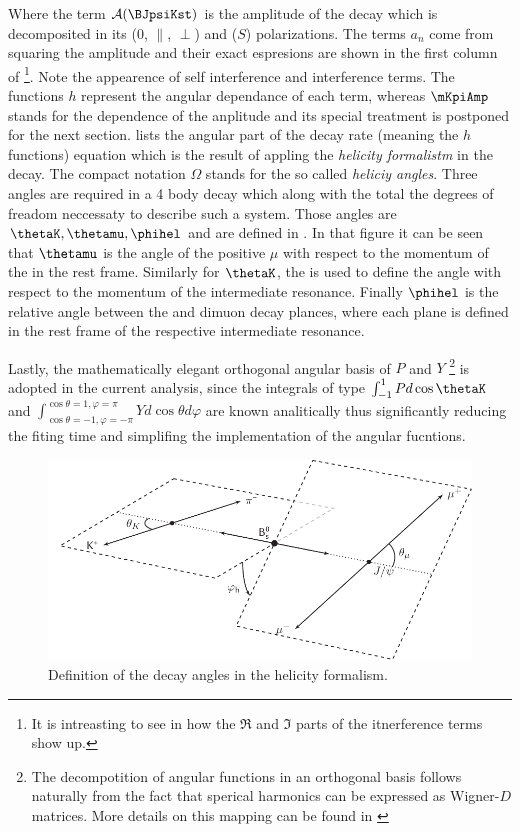 \noindent Where the term $\mathcal{A}(\text{\BJpsiKst})$ is the amplitude of the decay which is decomposited in its \pwave ($0$, $\parallel$, $\perp$) and \swave ($S$) polarizations.
The terms $a_n$ come from squaring the amplitude and their exact espresions are shown in the first column of 
\footnote{It is intreasting to see in \cite{jeroenThesis} how the $\Re$ and $\Im$ parts of the itnerference terms show up.}. 
Note the appearence of \pwave self interference and \spwave interference terms. The functions $h$ represent the angular dependance of each term, whereas $\mKpiAmp$ stands 
for the \mkpi dependence of the anplitude and its special treatment is postponed for the next section.  lists the angular part of the decay rate 
(meaning the $h$ functions) equation which is the result of appling the \emph{helicity formalistm} in the \BJpsiKst decay. The compact
notation $\Omega$ stands for the so called \emph{heliciy angles}. Three angles are required in a 4 body decay which along with the \mkpi
total the degrees of freadom neccessaty to describe such a system. Those angles are $\thetaK,\thetamu,\phihel$ and are defined in . 
In that figure it can be seen that $\thetamu$ is the angle of the positive $\mu$ with respect to the momentum of the \Jpsi in the \Bs rest frame.
Similarly for $\thetaK$, the \kaon is used to define the angle with respect to the momentum of the intermediate \Kpi resonance. Finally $\phihel$ is 
the relative angle between the \Kpi and dimuon decay plances, where each plane is defined in the rest frame of the respective intermediate resonance.  

Lastly, the mathematically elegant orthogonal angular basis of $P$ and $Y$
\footnote{The decompotition of angular functions in an orthogonal basis follows naturally from the fact that sperical harmonics can be expressed as 
Wigner-$D$ matrices. More details on this mapping can be found in \cite{jeroenThesis} } 
is adopted in the current analysis, since the integrals of type $\int_{-1}^{1}Pd\cos\thetaK$ and $\int_{\cos\theta=-1,\varphi=-\pi}^{\cos\theta=1,\varphi=\pi}Yd\cos\theta d\varphi$ are known 
analitically thus significantly reducing the fiting time and simplifing the implementation of the angular fucntions.


\begin{figure}[h]
\begin{center}
  \includegraphics[width=\textwidth]{Figures/Chapter4/helAngles.pdf}
  \caption{Definition of the decay angles in the helicity formalism.}
  \label{helAngles}  
\end{center}
\end{figure}


